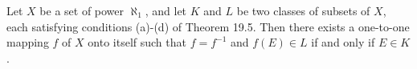 Let $X$ be a set of power $\aleph_1$, and let $K$ and $L$ be two classes of subsets of $X$, each satisfying conditions (a)-(d) of Theorem 19.5. Then there exists a one-to-one mapping $f$ of $X$ onto itself such that $f = f^{-1}$ and $f(E) \in L$ if and only if $E \in K$.
